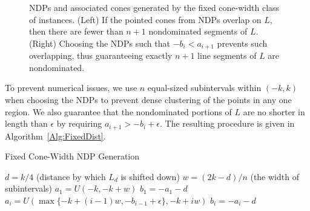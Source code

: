 \documentclass[11pt]{article} %
\begin{document}
\begin{figure}[t!]
\begin{center}
\caption{NDPs and associated cones generated by the fixed cone-width class of instances. (Left) If the pointed cones from NDPs overlap on $L$, then there are fewer than $n+1$ nondominated segments of $L$. (Right) Choosing the NDPs such that $-b_i < a_{i+1}$ prevents such overlapping, thus guaranteeing exactly $n+1$ line segments of $L$ are nondominated.\label{Fig:FixedDistInstances} }
\end{center}
\end{figure}

To prevent numerical issues, we use $n$ equal-sized subintervals within $(-k,k)$ when choosing the NDPs to prevent dense clustering of the points in any one region. We also guarantee that the nondominated portions of $L$ are no shorter in length than $\epsilon$ by requiring $a_{i+1} > -b_i+\epsilon$. The resulting procedure is given in Algorithm~\ref{Alg:FixedDist}.

\begin{algorithm}[H]
	\caption{Fixed Cone-Width NDP Generation}\label{Alg:FixedDist}
	\small
	\begin{algorithmic}[1]
		\STATE $d=k/4$ (distance by which $L_d$ is shifted down)
		\STATE $w=(2k-d)/n$ (the width of subintervals)
		\STATE $a_1 = U(-k,-k+w)$
		\STATE $b_1 = -a_1 - d$
		\STATE $a_i = U(\max\{-k+(i-1)w,-b_{i-1}+\epsilon\},-k+iw)$ 
		\STATE $b_i = -a_i - d$
		\ENDFOR
	\end{algorithmic}
\end{algorithm}
\end{document}
